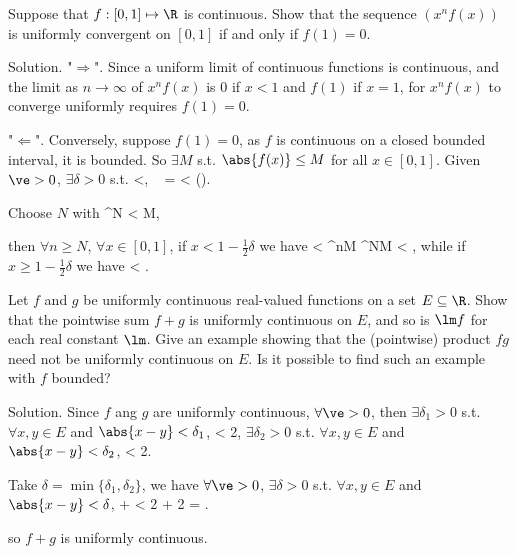 \een

\begin{exercise}
Suppose that $f : [0, 1] \mapsto \R$ is continuous. Show that the sequence $(x^nf(x))$ is uniformly convergent on $[0, 1]$ if and only if $f(1) = 0$.
\end{exercise}

Solution. "$\Longrightarrow$". Since a uniform limit of continuous functions is continuous, and the limit as $n\to \infty$ of $x^nf(x)$ is 0 if $x<1$ and $f(1)$ if $x=1$, for $x^n f(x)$ to converge uniformly requires $f(1)=0$.

"$\Longleftarrow$". Conversely, suppose $f(1)=0$, as $f$ is continuous on a closed bounded interval, it is bounded. So $\exists M$ s.t. $\abs{f(x)} \leq M$ for all $x\in [0,1]$. Given $\ve >0$, $\exists\delta>0$ s.t.
\be
{}<\delta, \  =  < \ve \quad().
\ee

Choose $N$ with 
\be
{}^N < \frac {\ve}M,
\ee

then $\forall n\geq N$, $\forall x\in [0,1]$, if $x< 1 -\tfrac 12 \delta $ we have
\be
{} < ^nM \leq {}^NM < \ve,
\ee
while if $x\geq 1 -\tfrac 12 \delta$ we have
\be
{} \leq {} < \ve.
\ee

\begin{exercise}\label{ques:x^2_uniform_continuous} 
Let $f$ and $g$ be uniformly continuous real-valued functions on a set $E \subseteq \R$. Show that the pointwise sum $f + g$ is uniformly continuous on $E$, and so is $\lm f$ for each real constant $\lm$. Give an example showing that the (pointwise) product $fg$ need not be uniformly continuous on $E$. Is
it possible to find such an example with $f$ bounded?
\end{exercise}

Solution. Since $f$ ang $g$ are uniformly continuous, $\forall \ve >0$, then $\exists \delta_1>0$ s.t. $\forall x,y \in E$ and $\abs{x-y}<\delta_1$,
\be
{} < \frac {\ve}2,
\ee
$\exists \delta_2>0$ s.t. $\forall x,y \in E$ and $\abs{x-y}<\delta_2$,
\be
{} < \frac {\ve}2.
\ee

Take $\delta = \min\{\delta_1,\delta_2\}$, we have $\forall \ve>0$, $\exists \delta>0$ s.t. $\forall x,y \in E$ and $\abs{x-y}<\delta$,
\be
{} \leq {} +  < \frac {\ve}2 + \frac {\ve}2 = \ve.
\ee

so $f+g$ is uniformly continuous.

